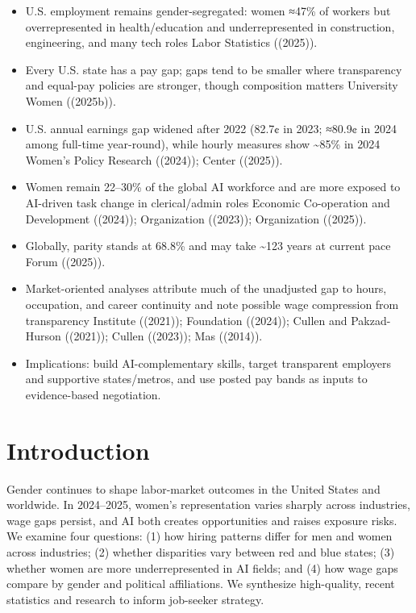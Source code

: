 \documentclass[
  letterpaper,
  DIV=11,
  numbers=noendperiod]{scrartcl}
\providecommand{\tightlist}{%
  \setlength{\itemsep}{0pt}\setlength{\parskip}{0pt}}
\begin{document}
\begin{itemize}
\tightlist
\item
  U.S. employment remains gender-segregated: women ≈47\% of workers but
  overrepresented in health/education and underrepresented in
  construction, engineering, and many tech roles Labor Statistics
  ((2025)).
\item
  Every U.S. state has a pay gap; gaps tend to be smaller where
  transparency and equal-pay policies are stronger, though composition
  matters University Women ((2025b)).
\item
  U.S. annual earnings gap widened after 2022 (82.7¢ in 2023; ≈80.9¢ in
  2024 among full-time year-round), while hourly measures show
  \textasciitilde85\% in 2024 Women's Policy Research ((2024)); Center
  ((2025)).
\item
  Women remain 22--30\% of the global AI workforce and are more exposed
  to AI-driven task change in clerical/admin roles Economic Co-operation
  and Development ((2024)); Organization ((2023)); Organization
  ((2025)).
\item
  Globally, parity stands at 68.8\% and may take \textasciitilde123
  years at current pace Forum ((2025)).
\item
  Market-oriented analyses attribute much of the unadjusted gap to
  hours, occupation, and career continuity and note possible wage
  compression from transparency Institute ((2021)); Foundation ((2024));
  Cullen and Pakzad-Hurson ((2021)); Cullen ((2023)); Mas ((2014)).
\item
  Implications: build AI-complementary skills, target transparent
  employers and supportive states/metros, and use posted pay bands as
  inputs to evidence-based negotiation.
\end{itemize}

\section{Introduction}\label{introduction}

Gender continues to shape labor-market outcomes in the United States and
worldwide. In 2024--2025, women's representation varies sharply across
industries, wage gaps persist, and AI both creates opportunities and
raises exposure risks. We examine four questions: (1) how hiring
patterns differ for men and women across industries; (2) whether
disparities vary between red and blue states; (3) whether women are more
underrepresented in AI fields; and (4) how wage gaps compare by gender
and political affiliations. We synthesize high-quality, recent
statistics and research to inform job-seeker strategy.
\end{document}
